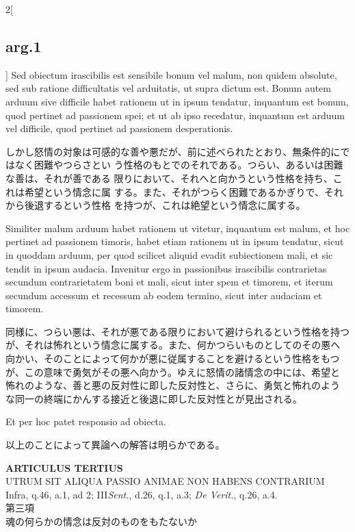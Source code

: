 \documentclass[paper=a4paper,fontsize=10pt,jafontsize=9pt,titlepage]{jlreq}
\begin{document}
\begin{paracol}{2}[\subsection{arg.1}]
Sed obiectum irascibilis est sensibile bonum
vel malum, non quidem absolute, sed sub ratione difficultatis vel
arduitatis, ut supra dictum est. Bonum autem arduum sive difficile habet
rationem ut in ipsum tendatur, inquantum est bonum, quod pertinet ad
passionem spei; et ut ab ipso recedatur, inquantum est arduum vel
difficile, quod pertinet ad passionem desperationis.

\switchcolumn

しかし怒情の対象は可感的な善や悪だが、前に述べられたとおり、無条件的にではなく困難やつらさとい
 う性格のもとでのそれである。つらい、あるいは困難な善は、それが善である
 限りにおいて、それへと向かうという性格を持ち、これは希望という情念に属
 する。また、それがつらく困難であるかぎりで、それから後退するという性格
 を持つが、これは絶望という情念に属する。

\switchcolumn*

Similiter malum
arduum habet rationem ut vitetur, inquantum est malum, et hoc pertinet
ad passionem timoris, habet etiam rationem ut in ipsum tendatur, sicut
in quoddam arduum, per quod scilicet aliquid evadit subiectionem mali,
et sic tendit in ipsum audacia. Invenitur ergo in passionibus
irascibilis contrarietas secundum contrarietatem boni et mali, sicut
inter spem et timorem, et iterum secundum accessum et recessum ab eodem
termino, sicut inter audaciam et timorem.

\switchcolumn

同様に、つらい悪は、それが悪である限りにおいて避けられるという性格を持つ
 が、それは怖れという情念に属する。また、何かつらいものとしてのその悪へ
 向かい、そのことによって何かが悪に従属することを避けるという性格をもつ
 が、この意味で勇気がその悪へ向かう。ゆえに怒情の諸情念の中には、希望と
 怖れのような、善と悪の反対性に即した反対性と、さらに、勇気と怖れのよう
 な同一の終端にかんする接近と後退に即した反対性とが見出される。

\switchcolumn*

Et per hoc patet responsio ad obiecta.

\switchcolumn

以上のことによって異論への解答は明らかである。

\end{paracol}
\newpage
{}
{}
\setcounter{section}{3}
\setcounter{subsection}{0}



\begin{center}
{\Large {\bfseries ARTICULUS TERTIUS}}\\
{\large UTRUM SIT ALIQUA PASSIO ANIMAE NON HABENS CONTRARIUM}\\
{\footnotesize Infra, q.46, a.1, ad 2; III{\itshape Sent.}, d.26, q.1,
 a.3; {\itshape De Verit.}, q.26, a.4.}\\
{\Large 第三項\\魂の何らかの情念は反対のものをもたないか}
\end{center}
\end{document}
